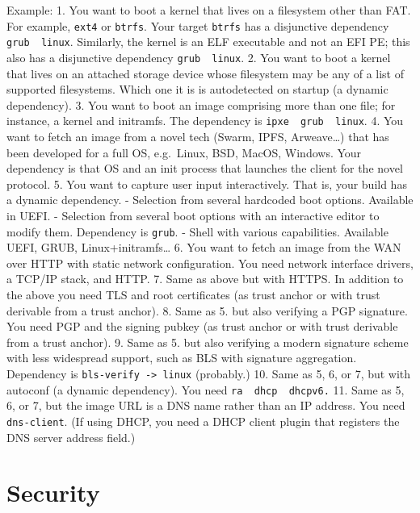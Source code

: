 Example: 1. You want to boot a kernel that lives on a filesystem other
than FAT. For example, \texttt{ext4} or \texttt{btrfs}. Your target
\texttt{btrfs} has a disjunctive dependency
\texttt{grub\ \textbar{}\textbar{}\ linux}. Similarly, the kernel is an
ELF executable and not an EFI PE; this also has a disjunctive dependency
\texttt{grub\ \textbar{}\textbar{}\ linux}. 2. You want to boot a kernel
that lives on an attached storage device whose filesystem may be any of
a list of supported filesystems. Which one it is is autodetected on
startup (a dynamic dependency). 3. You want to boot an image comprising
more than one file; for instance, a kernel and initramfs. The dependency
is
\texttt{ipxe\ \textbar{}\textbar{}\ grub\ \textbar{}\textbar{}\ linux}.
4. You want to fetch an image from a novel tech (Swarm, IPFS,
Arweave\ldots) that has been developed for a full OS, e.g.~Linux, BSD,
MacOS, Windows. Your dependency is that OS and an init process that
launches the client for the novel protocol. 5. You want to capture user
input interactively. That is, your build has a dynamic dependency. -
Selection from several hardcoded boot options. Available in UEFI. -
Selection from several boot options with an interactive editor to modify
them. Dependency is \texttt{grub}. - Shell with various capabilities.
Available UEFI, GRUB, Linux+initramfs\ldots{} 6. You want to fetch an
image from the WAN over HTTP with static network configuration. You need
network interface drivers, a TCP/IP stack, and HTTP. 7. Same as above
but with HTTPS. In addition to the above you need TLS and root
certificates (as trust anchor or with trust derivable from a trust
anchor). 8. Same as 5. but also verifying a PGP signature. You need PGP
and the signing pubkey (as trust anchor or with trust derivable from a
trust anchor). 9. Same as 5. but also verifying a modern signature
scheme with less widespread support, such as BLS with signature
aggregation. Dependency is \texttt{bls-verify\ -\textgreater{}\ linux}
(probably.) 10. Same as 5, 6, or 7, but with autoconf (a dynamic
dependency). You need
\texttt{ra\ \textbar{}\textbar{}\ dhcp\ \textbar{}\textbar{}\ dhcpv6.}
11. Same as 5, 6, or 7, but the image URL is a DNS name rather than an
IP address. You need \texttt{dns-client}. (If using DHCP, you need a
DHCP client plugin that registers the DNS server address field.)

\section{Security}

